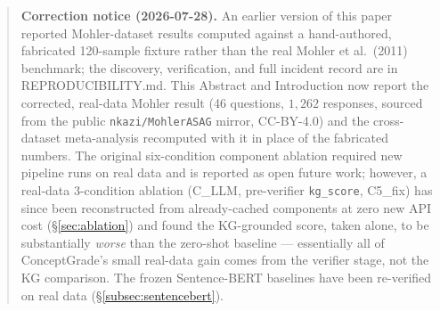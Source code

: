 \documentclass[conference]{IEEEtran}
\begin{document}
\begin{abstract}
\textbf{Correction notice (2026-07-28).} An earlier version of this paper
reported Mohler-dataset results computed against a hand-authored,
fabricated 120-sample fixture rather than the real Mohler et al.\ (2011)
benchmark; the discovery, verification, and full incident record are in
REPRODUCIBILITY.md. This Abstract and Introduction now report the
corrected, real-data Mohler result (46 questions, $1{,}262$ responses,
sourced from the public \texttt{nkazi/MohlerASAG} mirror, CC-BY-4.0) and
the cross-dataset meta-analysis recomputed with it in place of the
fabricated numbers. The original six-condition component ablation
required new pipeline runs on real data and is reported as open future
work; however, a real-data 3-condition ablation (C\_LLM,
pre-verifier \texttt{kg\_score}, C5\_fix) has since been reconstructed
from already-cached components at zero new API cost
(\S\ref{sec:ablation}) and found the KG-grounded score, taken alone, to
be substantially \emph{worse} than the zero-shot baseline --- essentially
all of ConceptGrade's small real-data gain comes from the verifier
stage, not the KG comparison. The frozen Sentence-BERT baselines have
been re-verified on real data (\S\ref{subsec:sentencebert}).


\end{abstract}
\end{document}
